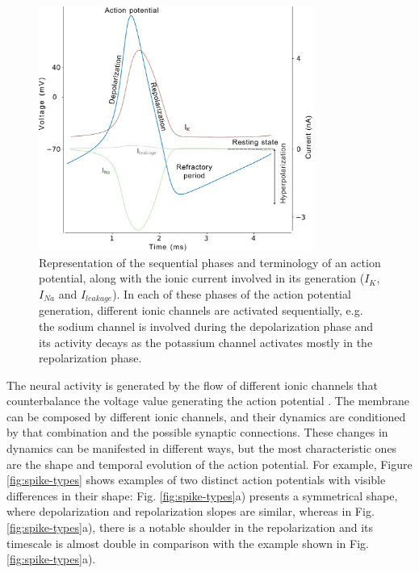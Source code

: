 \begin{figure}[htb!]
    \centering
    \includegraphics[width=0.8\textwidth]{img/intro/action_potential.pdf}
    \caption{Representation of the sequential phases and terminology of an action potential, along with the ionic current involved in its generation ($I_K$,$I_{Na}$ and $I_{leakage}$). In each of these phases of the action potential generation, different ionic channels are activated sequentially, e.g. the sodium channel is involved during the depolarization phase and its activity decays as the potassium channel activates mostly in the repolarization phase. }
    \label{fig:action potential}
\end{figure}

The neural activity is generated by the flow of different ionic channels that counterbalance the voltage value generating the action potential \parencite{koch_biophysics_1999}. The membrane can be composed by different ionic channels, and their dynamics are conditioned by that combination and the possible synaptic connections. These changes in dynamics can be manifested in different ways, but the most characteristic ones are the shape and temporal evolution of the action potential. %
For example, Figure \ref{fig:spike-types} shows examples of two distinct action potentials with visible differences in their shape: Fig. \ref{fig:spike-types}a) presents a symmetrical shape, where depolarization and repolarization slopes are similar, whereas in Fig. \ref{fig:spike-types}a), there is a notable shoulder in the repolarization and its timescale is almost double in comparison with the example shown in Fig.\ref{fig:spike-types}a).

